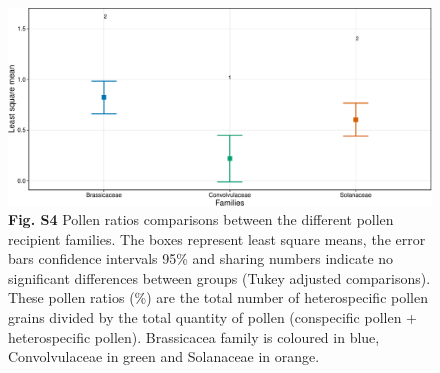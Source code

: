 \documentclass[12pt,]{article}
\begin{document}
\begin{figure}
\centering
\includegraphics{Supp_Material_files/figure-latex/unnamed-chunk-13-1.pdf}
\caption{\textbf{Fig. S4} Pollen ratios comparisons between the
different pollen recipient families. The boxes represent least square
means, the error bars confidence intervals 95\% and sharing numbers
indicate no significant differences between groups (Tukey adjusted
comparisons). These pollen ratios (\%) are the total number of
heterospecific pollen grains divided by the total quantity of pollen
(conspecific pollen + heterospecific pollen). Brassicacea family is
coloured in blue, Convolvulaceae in green and Solanaceae in orange.}
\end{figure}

\newpage
\end{document}
